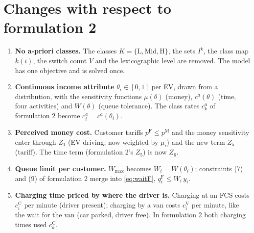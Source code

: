 \documentclass[12pt,a4paper]{article}
\begin{document}
\section{Changes with respect to formulation 2}
\begin{enumerate}[itemsep=2pt]
  \item \textbf{No a-priori classes.} The classes $K=\{\mathrm L,\mathrm{Mid},\mathrm H\}$, the sets $I^{k}$, the class map $k(i)$, the switch count $V$ and the lexicographic level are removed. The model has one objective and is solved once.
  \item \textbf{Continuous income attribute} $\theta_i\in[0,1]$ per EV, drawn from a distribution, with the sensitivity functions $\mu(\theta)$ (money), $c^{a}(\theta)$ (time, four activities) and $W(\theta)$ (queue tolerance). The class rates $c^{a}_k$ of formulation 2 become $c^{a}_i=c^{a}(\theta_i)$.
  \item \textbf{Perceived money cost.} Customer tariffs $p^{\mathrm F}\le p^{\mathrm M}$ and the money sensitivity enter through $Z_1$ (EV driving, now weighted by $\mu_i$) and the new term $Z_5$ (tariff). The time term (formulation 2's $Z_5$) is now $Z_6$.
  \item \textbf{Queue limit per customer.} $W_{\max}$ becomes $W_i=W(\theta_i)$; constraints (7) and (9) of formulation 2 merge into \eqref{eq:waitF}, $q^{\mathrm F}_i\le W_i\,y_i$.
  \item \textbf{Charging time priced by where the driver is.} Charging at an FCS costs $c^{\mathrm C}_i$ per minute (driver present); charging by a van costs $c^{\mathrm V}_i$ per minute, like the wait for the van (car parked, driver free). In formulation 2 both charging times used $c^{\mathrm C}_k$.
\end{enumerate}
\end{document}
